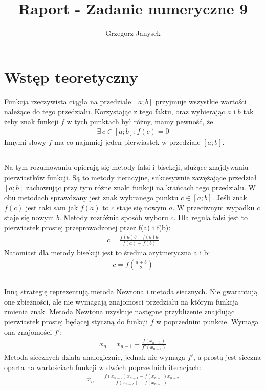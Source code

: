 \documentclass[11pt]{extarticle}
\author{Grzegorz Janysek}
\title{Raport - Zadanie numeryczne 9}
\begin{document}
	\maketitle

	\section{Wstęp teoretyczny}
	Funkcja rzeczywista ciągła na przedziale \([a;b]\) przyjmuje wszystkie wartości należące do tego przedziału.
	Korzystając z tego faktu, oraz wybierając \(a\) i \(b\) tak żeby znak funkcji \(f\) w tych punktach był różny, mamy pewność, że 
	\begin{align}
		\exists \,c \in [a;b] : f(c) = 0
	\end{align}
	Innymi słowy \(f\) ma co najmniej jeden pierwiastek w przedziale \([a;b]\).
	
	\subsection{}
	Na tym rozumowaniu opierają się metody falsi i bisekcji, służące znajdywaniu pierwiastków funkcji.
	Są to metody iteracyjne, sukcesywnie zawężające przedział \([a;b]\) zachowując przy tym różne znaki funkcji na krańcach tego przedziału.
	W obu metodach sprawdzany jest znak wybranego punktu \(c \in [a;b]\).
	Jeśli znak \(f(c)\) jest taki sam jak \(f(a)\) to \(c\) staje się nowym \(a\).
	W przeciwnym wypadku \(c\) staje się nowym \(b\). Metody rozróżnia sposób wyboru \(c\).
	Dla regula falsi jest to pierwiastek prostej przeprowadzonej przez f(a) i f(b):
	\begin{align}
		c = \frac{ f(a)b - f(b)a }{ f(a) - f(b) }
	\end{align}
	Natomiast dla metody bisekcji jest to średnia arytmetyczna a i b:
	\begin{align}
		c = f\left(\frac{a+b}{2}\right)
	\end{align}
	
	\subsection{}
	Inną strategię reprezentują metoda Newtona i metoda siecznych.
	Nie gwarantują one zbieżności, ale nie wymagają znajomosci przedziału na którym funkcja zmienia znak.
	Metoda Newtona uzyskuje następne przybliżenie znajdując pierwiastek prostej będącej styczną do funkcji \(f\) w poprzednim punkcie. Wymaga ona znajomości \(f'\):
	\begin{align}
		x_{n} = x_{n-1} - \frac{f(x_{n-1})}{f'(x_{n-1})}
	\end{align}
	Metoda siecznych działa analogicznie, jednak nie wymaga \(f'\), a prostą jest sieczna oparta na wartościach funkcji w dwóch poprzednich iteracjach:
	\begin{align}
		x_{n} = \frac{ f(x_{n-2})x_{n-1} - f(x_{n-1})x_{n-2} }{ f(x_{n-2}) - f(x_{n-1}) }
	\end{align}
\end{document}
